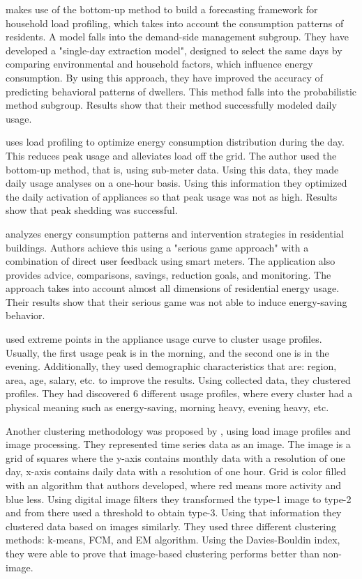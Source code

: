 \cite{Gao2018} makes use of the bottom-up method to build a forecasting framework for household
load profiling, which takes into account the consumption patterns of residents. 
A model falls into the demand-side management subgroup.
They have developed a "single-day extraction model", designed to select the same days by comparing environmental and household factors, which influence energy consumption.
By using this approach, they have improved the accuracy of predicting behavioral patterns of dwellers. 
This method falls into the probabilistic method subgroup. Results show that their method successfully modeled daily usage.

\cite{Chuan2014} uses load profiling to optimize energy consumption distribution during the day.
This reduces peak usage and alleviates load off the grid. The author used the bottom-up method, that is, using sub-meter data.
Using this data, they made daily usage analyses on a one-hour basis. Using this information they optimized the daily activation of appliances
so that peak usage was not as high. Results show that peak shedding was successful. 

\cite{Csoknyai2019} analyzes energy consumption patterns and intervention strategies in residential buildings.
Authors achieve this using a "serious game approach" with a combination of direct user feedback using smart meters. 
The application also provides advice, comparisons, savings, reduction goals, and monitoring.
The approach takes into account almost all dimensions of residential energy usage. Their results show that their serious game was not
able to induce energy-saving behavior.

\cite{Jeong2021} used extreme points in the appliance usage curve to cluster usage profiles.
Usually, the first usage peak is in the morning, and the second one is in the evening. 
Additionally, they used demographic characteristics that are: region, area, age, salary, etc. to improve the results.
Using collected data, they clustered profiles. They had discovered 6 different usage profiles, 
where every cluster had a physical meaning such as energy-saving, morning heavy, evening heavy, etc.

Another clustering methodology was proposed by \cite{Park2019}, using load image profiles and image processing.
They represented time series data as an image. The image is a grid of squares where the y-axis contains monthly data with a resolution of one day,
x-axis contains daily data with a resolution of one hour. Grid is color filled with an algorithm that authors developed,
where red means more activity and blue less. Using digital image filters they transformed the type-1 image to type-2 and from there
used a threshold to obtain type-3. Using that information they clustered data based on images similarly. They used three different 
clustering methods: k-means, FCM, and EM algorithm. Using the Davies-Bouldin index, they were able to prove that image-based clustering performs better than non-image.

